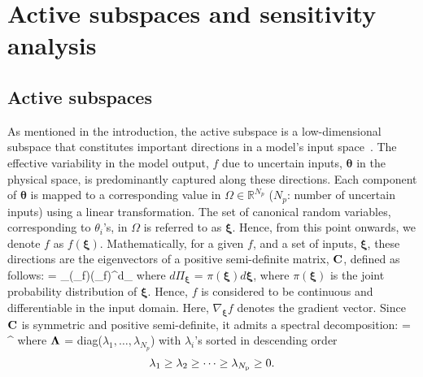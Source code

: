 \section{Active subspaces and sensitivity analysis}
\label{sec:assa}

\subsection{Active subspaces}
\label{sub:ac}
As mentioned in the introduction, the active subspace is a low-dimensional subspace
that constitutes important directions in a model's input
space~\cite{Constantine:2015}. The effective variability in the model output, $f$
due to uncertain inputs, $\bm{\theta}$ in the physical space, is predominantly captured
along these directions. Each component of $\bm{\theta}$
is mapped to a corresponding value in $\Omega\in\mathbb{R}^{N_p}$
($N_p$: number of uncertain inputs)
using a linear transformation.  The set of canonical random variables, corresponding
to $\theta_i$'s, in $\Omega$ is referred to as $\bm{\xi}$.
Hence, from this point onwards, we denote $f$ as $f(\bm{\xi})$.
Mathematically, for a given $f$, and a set of inputs, $\bm{\xi}$,
these directions are the eigenvectors of a positive
semi-definite matrix, $\mathbf{{C}}$, defined as follows: 
%
\be
{} = \int_\Omega (\nabla_{\bm{\xi}}f)(\nabla_{\bm{\xi}}f)^\top d\Pi_{\bm{\xi}}
\label{eq:C}
\ee
%
where 
$d\Pi_{\bm{\xi}}$ = $\pi(\bm{\xi})d\bm{\xi}$, where $\pi(\bm{\xi})$ is the joint probability
distribution of $\bm{\xi}$. Hence, $f$ is considered to be continuous 
and differentiable in the input domain. 
Here,
$\nabla_{\bm{\xi}}f$ denotes the gradient vector. 
Since $\mathbf{{C}}$ is symmetric and
positive semi-definite, it admits a spectral decomposition:
%
\be
{} = \mat{\Lambda}^\top
\ee
%
where $\mathbf{{\Lambda}}$ = diag($\lambda_1,\ldots,\lambda_{N_p}$) with
$\lambda_i$'s sorted in descending order
\[
     \lambda_1 \geq \lambda_2 \geq \cdots \geq \lambda_{N_\text{p}} \geq 0.
\] 
